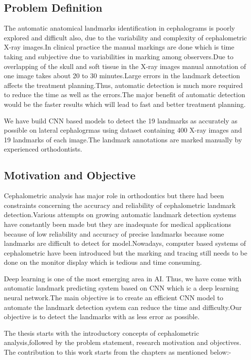 \documentclass[sn-mathphys]{sn-jnl}%
\theoremstyle{thmstyleone}%
\theoremstyle{thmstyletwo}%
\theoremstyle{thmstylethree}%
\begin{document}
\subsection{Problem Definition}
The automatic anatomical landmarks identification in cephalograms is poorly explored and difficult also, due to the variability and complexity of cephalometric X-ray images.In clinical practice the manual markings are done which is time taking and subjective due to variabilities in marking among observers.Due to overlapping of the skull and soft tissue in the X-ray images manual annotation of one image takes about 20 to 30 minutes.Large errors in the landmark detection affects the treatment planning.Thus, automatic detection is much more required to reduce the time as well as the errors.The major benefit of automatic detection would be the faster results which will lead to fast and better treatment planning.

\par We have build CNN based models to detect the 19 landmarks as accurately as possible on lateral cephalogrmas using dataset containing 400 X-ray images and 19 landmarks of each image.The landmark annotations are marked manually by experienced orthodontists. 

\subsection{Motivation and Objective}
Cephalometric analysis has major role in orthodontics but there had been constraints concerning the accuracy and reliability of cephalometric landmark detection.Various attempts on growing automatic landmark detection systems have constantly been made but they are inadequate for medical applications because of low reliability and accuracy of precise landmarks because some landmarks are difficult to detect for model.Nowadays, computer based systems of cephalometric have been introduced but the marking and tracing still needs to be done on the monitor display which is tedious and time consuming.

\par Deep learning is one of the most emerging area in AI. Thus, we have come with automatic landmark predicting system based on CNN which ic a deep learning neural network.The main objective is to create an efficient CNN model to automate the landmark detection system can reduce the time and difficulty.Our objective is to detect the landmarks with as less error as possible.


The thesis starts with the introductory concepts of cephalometric analysis,followed by the problem statement, research motivation and objectives. The contribution to this work starts from the chapters as mentioned below:-
\end{document}
